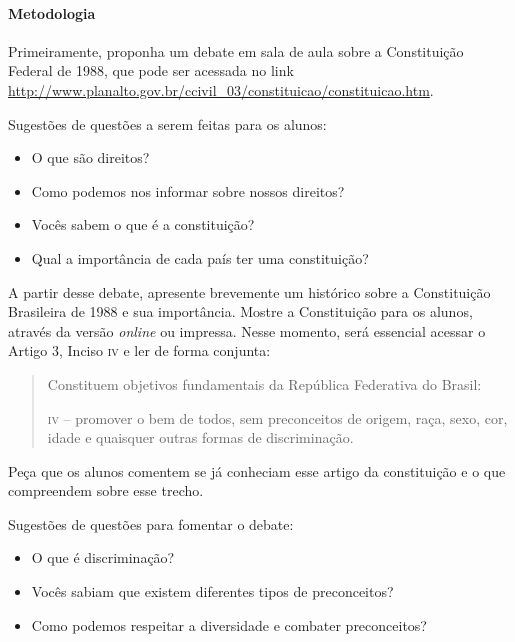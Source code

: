 \documentclass[11pt]{extarticle}
\begin{document}
\paragraph{Metodologia} Primeiramente, proponha um debate em sala de aula sobre a Constituição Federal de 1988, que pode ser acessada no link \url{http://www.planalto.gov.br/ccivil_03/constituicao/constituicao.htm}.

Sugestões de questões a serem feitas para os alunos:

\begin{itemize}

\item O que são direitos?

\item Como podemos nos informar sobre nossos direitos?

\item Vocês sabem o que é a constituição? 

\item Qual a importância de cada país ter uma constituição?

\end{itemize}

A partir desse debate, apresente brevemente um histórico sobre a Constituição Brasileira de 1988 e sua importância. Mostre a Constituição para os alunos, através da versão \textit{online} ou impressa. Nesse momento, será essencial acessar o Artigo 3, Inciso \textsc{iv} e ler de forma conjunta: 

\begin{quote}Constituem objetivos fundamentais da República Federativa do Brasil:

\textsc{iv} -- promover o bem de todos, sem preconceitos de origem, raça, sexo, cor, idade e quaisquer outras formas de discriminação.\end{quote}

Peça que os alunos comentem se já conheciam esse artigo da constituição e o que compreendem sobre esse trecho. 

Sugestões de questões para fomentar o debate:

\begin{itemize}

\item O que é discriminação?

\item Vocês sabiam que existem diferentes tipos de preconceitos?

\item Como podemos respeitar a diversidade e combater preconceitos?

\end{itemize}
\end{document}
